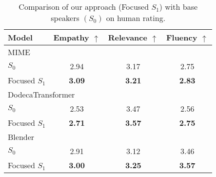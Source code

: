 \documentclass[11pt]{article}
\begin{document}
{\renewcommand{\arraystretch}{1.1}\begin{table}[t] \begin{center}
    \small
    \setlength{\tabcolsep}{6.9pt}
    \begin{tabular}{lccc}
        \toprule
        Model                       & Empathy $\uparrow$  & Relevance $\uparrow$  & Fluency $\uparrow$    \\
        \midrule
        \multicolumn{4}{l}{MIME \cite{Majumder:2020:EMNLP}} \\
        \addlinespace[0.1cm]
        \hspace{1mm}$S_0$             & 2.94            & 3.17                  & 2.75 \\
\hspace{1mm}Focused $S_1$     & \textbf{3.09}   & \textbf{3.21}         & \textbf{2.83} \\
        \midrule
        \multicolumn{4}{l}{DodecaTransformer \citep{Shuster:2020:ACL}} \\
        \addlinespace[0.1cm]
        \hspace{1mm}$S_0$             & 2.53            & 3.47                  & 2.56                    \\
\hspace{1mm}Focused $S_1$     & \textbf{2.71}   & \textbf{3.57}    & \textbf{2.75}                     \\
        \midrule
        \multicolumn{4}{l}{Blender \citep{Roller:2021:EACL}} \\
        \addlinespace[0.1cm]
        \hspace{1mm}$S_0$             & 2.91            & 3.12                  & 3.46                    \\
\hspace{1mm}Focused $S_1$     & \textbf{3.00}   & \textbf{3.25}        & \textbf{3.57}                     \\
        \bottomrule
    \end{tabular}
    \vspace{-3pt}
    \caption{
        Comparison of our approach (Focused $S_1$) with base speakers $(S_0)$ on human rating. }
    \vspace{-8pt}
    \label{tab:amt_human_rating}
\end{center}\end{table}}
\end{document}
